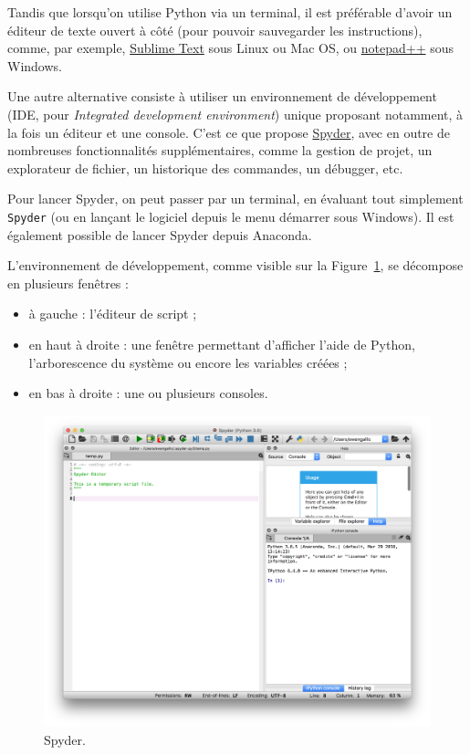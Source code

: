\documentclass[12pt,]{book}
\providecommand{\tightlist}{%
  \setlength{\itemsep}{0pt}\setlength{\parskip}{0pt}}
\numberwithin{equation}{section}
\numberwithin{countremarque}{section}
\begin{document}
Tandis que lorsqu'on utilise Python via un terminal, il est préférable
d'avoir un éditeur de texte ouvert à côté (pour pouvoir sauvegarder les
instructions), comme, par exemple,
\href{https://www.sublimetext.com/}{Sublime Text} sous Linux ou Mac OS,
ou \href{https://notepad-plus-plus.org/}{notepad++} sous Windows.

Une autre alternative consiste à utiliser un environnement de
développement (IDE, pour \emph{Integrated development environment})
unique proposant notamment, à la fois un éditeur et une console. C'est
ce que propose \href{https://www.spyder-ide.org/}{Spyder}, avec en outre
de nombreuses fonctionnalités supplémentaires, comme la gestion de
projet, un explorateur de fichier, un historique des commandes, un
débugger, etc.

Pour lancer Spyder, on peut passer par un terminal, en évaluant tout
simplement \texttt{Spyder} (ou en lançant le logiciel depuis le menu
démarrer sous Windows). Il est également possible de lancer Spyder
depuis Anaconda.

L'environnement de développement, comme visible sur la
Figure~\ref{fig:intro-spyder}, se décompose en plusieurs fenêtres :

\begin{itemize}
\tightlist
\item
  à gauche : l'éditeur de script ;
\item
  en haut à droite : une fenêtre permettant d'afficher l'aide de Python,
  l'arborescence du système ou encore les variables créées ;
\item
  en bas à droite : une ou plusieurs consoles.
\end{itemize}

\begin{figure}[H]

{\centering \includegraphics[width=1\linewidth]{figs/spyder} 

}

\caption{Spyder.}\label{fig:intro-spyder}
\end{figure}
\end{document}
